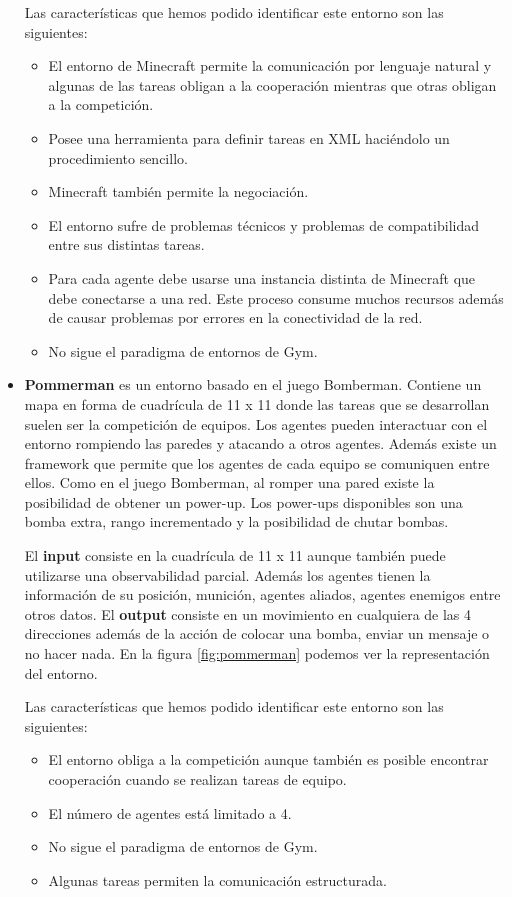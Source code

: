 \begin{itemize}
	      Las características que hemos podido identificar este entorno son las siguientes:
	      \begin{itemize}
		      \item El entorno de Minecraft permite la comunicación por lenguaje natural y algunas de las tareas obligan a la cooperación mientras que otras obligan a la competición.
		      \item Posee una herramienta para definir tareas en XML haciéndolo un procedimiento sencillo.
		      \item Minecraft también permite la negociación.
		      \item El entorno sufre de problemas técnicos y problemas de compatibilidad entre sus distintas tareas.
		      \item Para cada agente debe usarse una instancia distinta de Minecraft que debe conectarse a una red. Este proceso consume muchos recursos además de causar problemas por errores en la conectividad de la red.
		      \item No sigue el paradigma de entornos de Gym.
	      \end{itemize}

	\item \textbf{Pommerman} \cite {pommerman-repo} es un entorno basado en el juego Bomberman. Contiene un mapa en forma de cuadrícula de 11 x 11 donde las tareas que se desarrollan suelen ser la competición de equipos. Los agentes pueden interactuar con el entorno rompiendo las paredes y atacando a otros agentes. Además existe un framework que permite que los agentes de cada equipo se comuniquen entre ellos. Como en el juego Bomberman, al romper una pared existe la posibilidad de obtener un power-up. Los power-ups disponibles son una bomba extra, rango incrementado y la posibilidad de chutar bombas.  

	      El \textbf{input} consiste en la cuadrícula de 11 x 11 aunque también puede utilizarse una observabilidad parcial. Además los agentes tienen la información de su posición, munición, agentes aliados, agentes enemigos entre otros datos. El \textbf{output} consiste en un movimiento en cualquiera de las 4 direcciones además de la acción de colocar una bomba, enviar un mensaje o no hacer nada. En la figura \ref {fig:pommerman} podemos ver la representación del entorno.

	      Las características que hemos podido identificar este entorno son las siguientes:
	      \begin{itemize}
		      \item El entorno obliga a la competición aunque también es posible encontrar cooperación cuando se realizan tareas de equipo.
		      \item El número de agentes está limitado a 4.
		      \item No sigue el paradigma de entornos de Gym.
		      \item Algunas tareas permiten la comunicación estructurada.
	      \end{itemize}


\end{itemize}
